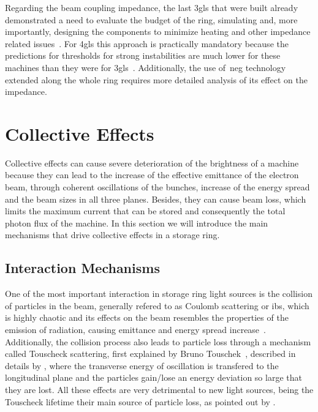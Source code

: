     Regarding the beam coupling impedance, the last \gls{3gls} that were built already demonstrated a need to evaluate the budget of the ring, simulating and, more importantly, designing the components to minimize heating and other impedance related issues~\cite{Nagaoka2004a,Gunzel2008,Blednykh2007,Blednykh2009}. For \gls{4gls} this approach is practically mandatory because the predictions for thresholds for strong instabilities are much lower for these machines than they were for \gls{3gls}~\cite{Klein2013a,Lindberg2015,Persichelli2017a,Wang2017,Wang2017a}.
    Additionally, the use of~\gls{neg} technology extended along the whole ring requires more detailed analysis of its effect on the impedance.

\section{Collective Effects}

    Collective effects can cause severe deterioration of the brightness of a machine because they can lead to the increase of the effective emittance of the electron beam, through coherent oscillations of the bunches, increase of the energy spread and the beam sizes in all three planes. Besides, they can cause beam loss, which limits the maximum current that can be stored and consequently the total photon flux of the machine. In this section we will introduce the main mechanisms that drive collective effects in a storage ring.

\subsection{Interaction Mechanisms}

    One of the most important interaction in storage ring light sources is the collision of particles in the beam, generally refered to as Coulomb scattering or \gls{ibs}, which is highly chaotic and its effects on the beam resembles the properties of the emission of radiation, causing emittance and energy spread increase~\cite{Piwinski1974,Bjorken1983,Kubo2001}. Additionally, the collision process also leads to particle loss through a mechanism called Touscheck scattering, first explained by Bruno Touschek~\cite{Bernardini1963}, described in details by , where the transverse energy of oscillation is transfered to the longitudinal plane and the particles gain/lose an energy deviation so large that they are lost. All these effects are very detrimental to new light sources, being the Touscheck lifetime their main source of particle loss, as pointed out by .

